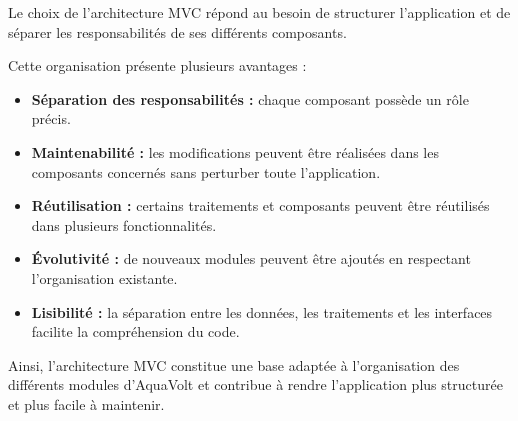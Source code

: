 Le choix de l'architecture MVC répond au besoin de structurer l'application et de séparer les responsabilités de ses différents composants.

Cette organisation présente plusieurs avantages :

\begin{itemize}[leftmargin=*]
    \item \textbf{Séparation des responsabilités :} chaque composant possède un rôle précis.
    \item \textbf{Maintenabilité :} les modifications peuvent être réalisées dans les composants concernés sans perturber toute l'application.
    \item \textbf{Réutilisation :} certains traitements et composants peuvent être réutilisés dans plusieurs fonctionnalités.
    \item \textbf{Évolutivité :} de nouveaux modules peuvent être ajoutés en respectant l'organisation existante.
    \item \textbf{Lisibilité :} la séparation entre les données, les traitements et les interfaces facilite la compréhension du code.
\end{itemize}

Ainsi, l'architecture MVC constitue une base adaptée à l'organisation des différents modules d'AquaVolt et contribue à rendre l'application plus structurée et plus facile à maintenir.
